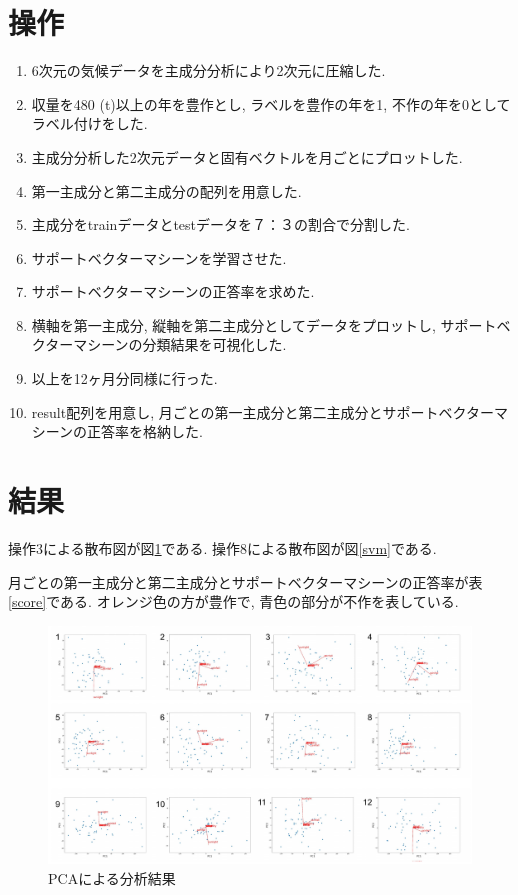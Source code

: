 \documentclass{jarticle}
\begin{document}
\hypertarget{header-n2026}{%
\section{操作}\label{header-n2026}}

\begin{enumerate}
\def\labelenumi{\arabic{enumi}.}
\item
  6次元の気候データを主成分分析により2次元に圧縮した.
\item
  収量を480 (t)以上の年を豊作とし, ラベルを豊作の年を1,
  不作の年を0としてラベル付けをした.
\item
  主成分分析した2次元データと固有ベクトルを月ごとにプロットした.
\item
  第一主成分と第二主成分の配列を用意した.
\item
  主成分をtrainデータとtestデータを７：３の割合で分割した.
\item
  サポートベクターマシーンを学習させた.
\item
  サポートベクターマシーンの正答率を求めた.
\item
  横軸を第一主成分, 縦軸を第二主成分としてデータをプロットし,
  サポートベクターマシーンの分類結果を可視化した.
\item
  以上を12ヶ月分同様に行った.
\item
  result配列を用意し,
  月ごとの第一主成分と第二主成分とサポートベクターマシーンの正答率を格納した.
\end{enumerate}

\hypertarget{header-n2048}{%
\section{結果}\label{header-n2048}}

操作3による散布図が図\ref{pca}である. 操作8による散布図が図\ref{svm}である.

月ごとの第一主成分と第二主成分とサポートベクターマシーンの正答率が表\ref{score}である.
オレンジ色の方が豊作で, 青色の部分が不作を表している.

\begin{figure}[H]
\centering
\includegraphics[keepaspectratio, scale=0.75]
{pca_plot.pdf}
\caption{PCAによる分析結果}
\label{pca}
\end{figure}
\end{document}
